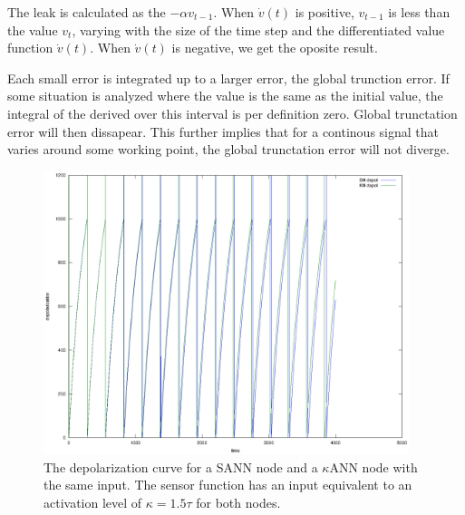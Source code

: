 The leak is calculated as the $-\alpha v_{t-1}$.
When $\dot{v}(t)$ is positive, $v_{t-1}$ is less than the value $v_t$, varying with the size of the time step and the differentiated value function $\dot{v}(t)$.
When $\dot{v}(t)$ is negative, we get the oposite result.

Each small error is integrated up to a larger error, the global trunction error. 
If some situation is analyzed where the value is the same as the initial value, the integral of the derived over this interval is per definition zero.
Global trunctation error will then dissapear. 
This further implies that for a continous signal that varies around some working point, the global trunctation error will not diverge.  %

\begin{figure}[hbt!]
	\centering
		\includegraphics[width=0.95\textwidth]{eps_comparison_between_KN_and_SN_ConstKappa.eps}
	\caption{The depolarization curve for a SANN node and a $\kappa$ANN node with the same input. The sensor function has an input equivalent to an activation level of $\kappa = 1.5 \tau$ for both nodes.} %
	\label{figComparisonBetweenSsensorAndKsensorDepolCurveCONStActivityLevel}
\end{figure}

